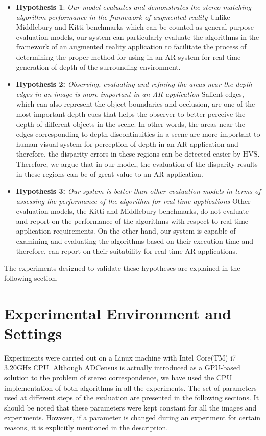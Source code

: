 \begin{itemize}
\item \textbf{Hypothesis 1}: \emph{Our model evaluates and demonstrates the stereo matching algorithm performance in the framework of augmented reality} 
Unlike Middlebury and Kitti benchmarks which can be counted as general-purpose evaluation models, our system can particularly evaluate the algorithms in the framework of an 
augmented reality application to facilitate the process of determining
the proper method for using in an AR system for real-time generation of depth of the surrounding environment.

\item \textbf{Hypothesis 2:} \emph{Observing, evaluating and refining the areas near the depth edges in an image is more important in an AR application}
Salient edges, which can also represent the object boundaries and occlusion, are one of the 
most important depth cues that helps the observer to better perceive the depth of different objects in the scene. In other words, the areas near the edges corresponding to depth discontinuities
in a scene are more important to human visual system for perception of depth in an AR application and therefore, the disparity 
errors in these regions can be detected easier by HVS. Therefore, we argue that in our model, the evaluation of the disparity results in these regions can be of great value 
to an AR application.

\item \textbf{Hypothesis 3:} \emph{Our system is better than other evaluation models in terms of assessing the performance of the algorithm for real-time applications}  
Other evaluation models, the Kitti and Middlebury benchmarks, do not evaluate and report on the performance of the algorithms
with respect to real-time application requirements. On the other hand, our system is capable of examining and evaluating the algorithms 
based on their execution time and therefore, can report on
their suitability for real-time AR applications.

\end{itemize}

The experiments designed to validate these hypotheses are explained in the following section.

\section{Experimental Environment and Settings}
Experiments were carried out on a Linux machine with Intel Core(TM) i7 3.20GHz CPU. 
Although ADCensus is actually introduced as a GPU-based solution to the problem of stereo correspondence, 
we have used the CPU implementation of both algorithms in all the experiments.
The set of parameters used at different steps of the evaluation are presented in the following sections.
It should be noted that these parameters were kept constant for all the images and experiments. However, if a parameter is changed during an experiment for certain
reasons, it is explicitly mentioned in the description.

